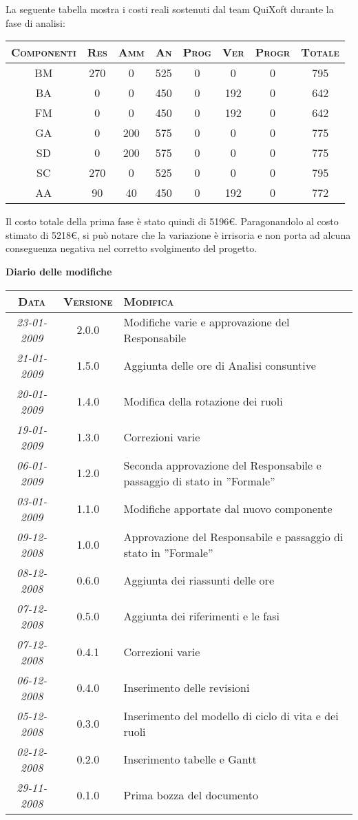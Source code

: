 \documentclass[11pt,a4paper]{article}
\newcommand{\modifiche} 
{
\newpage
\begin{center}
\textbf{Diario delle modifiche} \\
\bigskip
\begin{tabular}{|c|c|p{0.62\textwidth}|}
\hline
\textsc{Data} & \textsc{Versione} & \textsc{Modifica} \\
\hline
\hline
\textit{23-01-2009} & 2.0.0 & Modifiche varie e approvazione del Responsabile\\
\hline
\textit{21-01-2009} & 1.5.0 & Aggiunta delle ore di Analisi consuntive\\
\hline
\textit{20-01-2009} & 1.4.0 & Modifica della rotazione dei ruoli\\
\hline
\textit{19-01-2009} & 1.3.0 & Correzioni varie\\
\hline
\textit{06-01-2009} & 1.2.0 & Seconda approvazione del Responsabile e passaggio di stato in ''Formale''\\
\hline
\textit{03-01-2009} & 1.1.0 & Modifiche apportate dal nuovo componente\\
\hline
\textit{09-12-2008} & 1.0.0 & Approvazione del Responsabile e passaggio di stato in ''Formale''\\
\hline
\textit{08-12-2008} & 0.6.0 & Aggiunta dei riassunti delle ore \\
\hline
\textit{07-12-2008} & 0.5.0 & Aggiunta dei riferimenti e le fasi \\
\hline
\textit{07-12-2008} & 0.4.1 & Correzioni varie \\
\hline
\textit{06-12-2008} & 0.4.0 & Inserimento delle revisioni \\
\hline
\textit{05-12-2008} & 0.3.0 & Inserimento del modello di ciclo di vita e dei ruoli \\
\hline
\textit{02-12-2008} & 0.2.0 & Inserimento tabelle e Gantt \\
\hline
\textit{29-11-2008} & 0.1.0 & Prima bozza del documento \\
\hline
\end{tabular}
\end{center}
}
\begin{document}
La seguente tabella mostra i costi reali sostenuti dal team QuiXoft durante la fase di analisi:
\\
\begin{center}
\begin{tabular}{|c||c|c|c|c|c|c||c|}
\hline
\textsc{Componenti} & \textsc{Res} & \textsc{Amm} & \textsc{An} & \textsc{Prog} & \textsc{Ver} & \textsc{Progr} & \textsc{Totale}\\
\hline \hline
BM & 270 & 0 & 525 & 0 & 0 & 0 & 795 \\ \hline
BA & 0 & 0 & 450 & 0 & 192 & 0 & 642 \\ \hline
FM & 0 & 0 & 450 & 0 & 192 & 0 & 642 \\ \hline
GA & 0 & 200 & 575 & 0 & 0 & 0 & 775 \\ \hline
SD & 0 & 200 & 575 & 0 & 0 & 0 & 775 \\ \hline
SC & 270 & 0 & 525 & 0 & 0 & 0 & 795 \\ \hline
AA & 90 & 40 & 450 & 0 & 192 & 0 & 772 \\ \hline
\end{tabular}
\end{center}
\bigskip
Il costo totale della prima fase è stato quindi di 5196\euro. Paragonandolo al costo stimato di 5218\euro, si può notare che la variazione è irrisoria e non porta ad alcuna conseguenza negativa nel corretto svolgimento del progetto.
\modifiche
\end{document}
